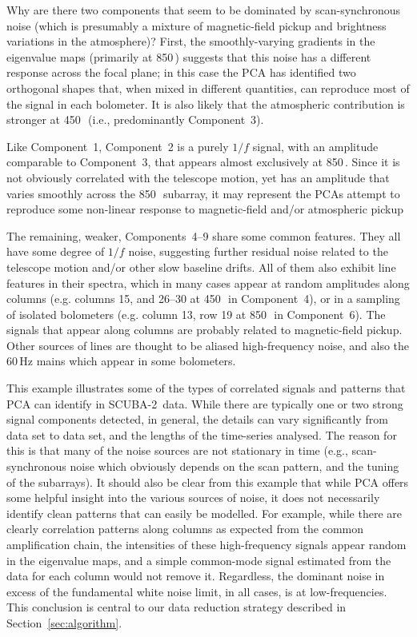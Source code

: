 \documentclass[useAMS,usenatbib,nofootinbib]{mn2e}
\newcommand{\scuba}{SCUBA-2}
\begin{document}
Why are there two components that seem to be dominated by
scan-synchronous noise (which is presumably a mixture of
magnetic-field pickup and brightness variations in the atmosphere)?
First, the smoothly-varying gradients in the eigenvalue maps
(primarily at 850\,\micron) suggests that this noise has a different
response across the focal plane; in this case the PCA has identified
two orthogonal shapes that, when mixed in different quantities, can
reproduce most of the signal in each bolometer. It is also likely that
the atmospheric contribution is stronger at 450\,\micron\ (i.e.,
predominantly Component~3).

Like Component~1, Component~2 is a purely $1/f$ signal, with an
amplitude comparable to Component~3, that appears almost exclusively
at 850\,\micron. Since it is not obviously correlated with the
telescope motion, yet has an amplitude that varies smoothly across the
850\,\micron\ subarray, it may represent the PCAs attempt to reproduce
some non-linear response to magnetic-field and/or atmospheric pickup

The remaining, weaker, Components~4--9 share some common
features. They all have some degree of $1/f$ noise, suggesting further
residual noise related to the telescope motion and/or other slow
baseline drifts. All of them also exhibit line features in their
spectra, which in many cases appear at random amplitudes along columns
(e.g. columns 15, and 26--30 at 450\,\micron\ in Component~4), or in a
sampling of isolated bolometers (e.g. column 13, row 19 at
850\,\micron\ in Component~6). The signals that appear along columns
are probably related to magnetic-field pickup. Other sources of lines
are thought to be aliased high-frequency noise, and also the 60\,Hz
mains which appear in some bolometers.

This example illustrates some of the types of correlated signals and
patterns that PCA can identify in \scuba\ data. While there are
typically one or two strong signal components detected, in general,
the details can vary significantly from data set to data set, and the
lengths of the time-series analysed. The reason for this is that many
of the noise sources are not stationary in time (e.g.,
scan-synchronous noise which obviously depends on the scan pattern,
and the tuning of the subarrays). It should also be clear from this
example that while PCA offers some helpful insight into the various
sources of noise, it does not necessarily identify clean patterns that
can easily be modelled. For example, while there are clearly
correlation patterns along columns as expected from the common
amplification chain, the intensities of these high-frequency signals
appear random in the eigenvalue maps, and a simple common-mode signal
estimated from the data for each column would not remove
it. Regardless, the dominant noise in excess of the fundamental white
noise limit, in all cases, is at low-frequencies. This conclusion is
central to our data reduction strategy described in
Section~\ref{sec:algorithm}.
\end{document}
